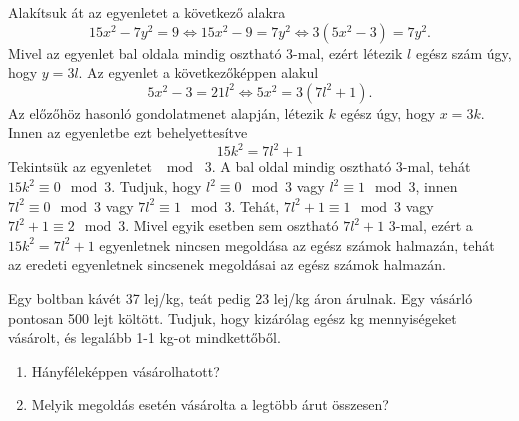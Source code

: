 \begin{solution}
Alakítsuk át az egyenletet a következő alakra 
\[
15x^{2}-7y^{2}=9\iff15x^{2}-9=7y^{2}\iff3(5x^{2}-3)=7y^{2}.
\]
Mivel az egyenlet bal oldala mindig osztható 3-mal, ezért létezik
$l$ egész szám úgy, hogy $y=3l$. Az egyenlet a következőképpen alakul
\[
5x^{2}-3=21l^{2}\iff5x^{2}=3(7l^{2}+1).
\]
Az előzőhöz hasonló gondolatmenet alapján, létezik $k$ egész úgy,
hogy $x=3k$. Innen az egyenletbe ezt behelyettesítve 
\[
15k^{2}=7l^{2}+1
\]
Tekintsük az egyenletet $\mod{}$ 3. A bal oldal mindig osztható 3-mal,
tehát $15k^{2}\equiv0\mod 3$. Tudjuk, hogy $l^{2}\equiv0\mod 3$
vagy $l^{2}\equiv1\mod 3$, innen $7l^{2}\equiv0\mod 3$ vagy $7l^{2}\equiv1\mod 3$.
Tehát, $7l^{2}+1\equiv1\mod 3$ vagy $7l^{2}+1\equiv2\mod 3$. Mivel
egyik esetben sem osztható $7l^{2}+1$ 3-mal, ezért a $15k^{2}=7l^{2}+1$
egyenletnek nincsen megoldása az egész számok halmazán, tehát az eredeti
egyenletnek sincsenek megoldásai az egész számok halmazán. 
\end{solution}
\begin{extraproblem}
Egy boltban kávét 37 lej/kg, teát pedig 23 lej/kg áron árulnak. Egy
vásárló pontosan 500 lejt költött. Tudjuk, hogy kizárólag egész kg
mennyiségeket vásárolt, és legalább 1-1 kg-ot mindkettőből.
\begin{enumerate}
\item Hányféleképpen vásárolhatott? 
\item Melyik megoldás esetén vásárolta a legtöbb árut összesen? 
\end{enumerate}
\end{extraproblem}
